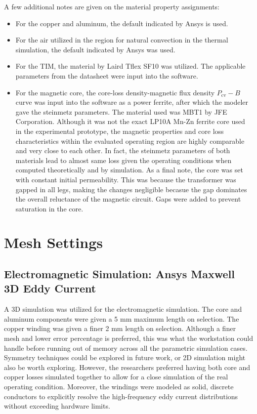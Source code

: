 A few additional notes are given on the material property assignments:
\begin{itemize}
    \item For the copper and aluminum, the default indicated by Ansys is used.
    \item For the air utilized in the region for natural convection in the thermal simulation, the default indicated by Ansys was used.
    \item For the TIM, the material by Laird Tflex SF10 was utilized. The applicable parameters from the datasheet were input into the software. 
    \item For the magnetic core, the core-loss density-magnetic flux density $P_{\mathrm{cv}}-B$ curve was input into the software as a power ferrite, after which the modeler gave the steinmetz parameters. The material used was MBT1 by JFE Corporation.  Although it was not the exact LP10A Mn-Zn ferrite core used in the experimental prototype, the magnetic properties and core loss characteristics within the evaluated operating region are highly comparable and very close to each other. In fact, the steinmetz parameters of both materials lead to almost same loss given the operating conditions when computed theoretically and by simulation. As a final note, the core was set with constant initial permeability. This was because the transformer was gapped in all legs, making the changes negligible becasue the gap dominates the overall reluctance of the magnetic circuit. Gaps were added to prevent saturation in the core.
\end{itemize}  

\section*{Mesh Settings}
\subsection*{Electromagnetic Simulation: Ansys Maxwell 3D Eddy Current}
A 3D simulation was utilized for the electromagnetic simulation. The core and aluminum components were given a 5 mm maximum length on selection. The copper winding was given a finer 2 mm length on selection. Although a finer mesh and lower error percentage is preferred, this was what the workstation could handle before running out of memory across all the parametric simulation cases. Symmetry techniques could be explored in future work, or 2D simulation might also be worth exploring. However, the researchers preferred having both core and copper losses simulated together to allow for a close simulation of the real operating condition. Moreover, the windings were modeled as solid, discrete conductors to explicitly resolve the high-frequency eddy current distributions without exceeding hardware limits.

